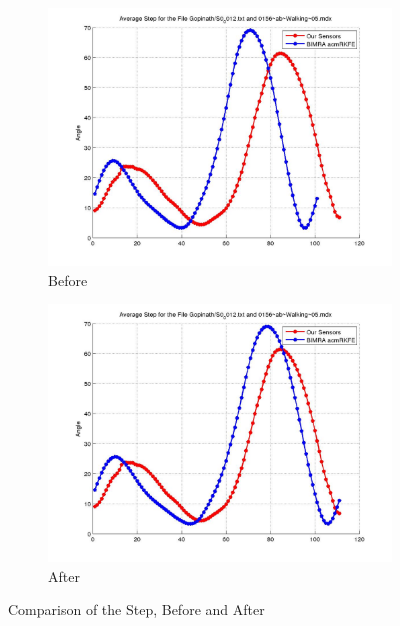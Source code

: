 \documentclass[12pt]{article}
\begin{document}
\begin{figure}[h]%

\begin{subfigure}[!htb]{2cm}
\hspace*{-2cm} \includegraphics[scale=.22]{S0_0012_before_acmrkfe.jpg}
\caption{Before}
\end{subfigure}
\hfill\hfill
\begin{subfigure}[h]{0.4\textwidth}
\hspace*{-2cm} \includegraphics[scale=.22]{S0_0012_after_acmrkfe.jpg}
\caption{After}
\end{subfigure}%

\caption[Hello]{Comparison of the Step, Before and After}
\end{figure}
\end{document}
